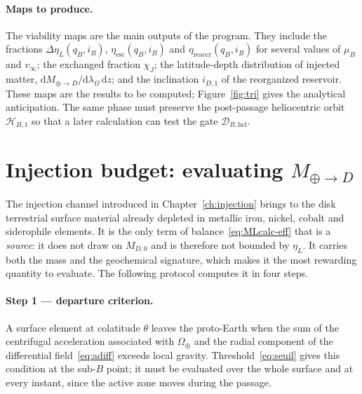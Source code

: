 \documentclass[11pt,a4paper,openany]{report}
\newcommand{\dd}{\mathrm{d}}
\begin{document}
\paragraph{Maps to produce.}
The viability maps are the main outputs of the program. They include the fractions
$\Delta\eta_L(q_B,i_B)$, $\eta_{\mathrm{esc}}(q_B,i_B)$ and $\eta_{\mathrm{reaccr}}(q_B,i_B)$ for
several values of $\mu_B$ and $v_\infty$; the exchanged fraction $\chi_J$; the latitude-depth
distribution of injected matter, $\dd M_{\oplus\to D}/\dd\lambda_\Omega\,\dd z$; and the
inclination $i_{D,1}$ of the reorganized reservoir. These maps are the results to be computed;
Figure~\ref{fig:tri} gives the analytical anticipation.
The same phase must preserve the post-passage heliocentric orbit $\mathcal{H}_{B,1}$ so that a
later calculation can test the gate $\mathcal{D}_{B,\mathrm{hel}}$.

\section{Injection budget: evaluating \texorpdfstring{$M_{\oplus\to D}$}{M_Earth-to-D}}
\label{sec:bilan-injection}

The injection channel introduced in Chapter~\ref{ch:injection} brings to the disk terrestrial
surface material already depleted in metallic iron, nickel, cobalt and siderophile elements. It is
the only term of balance~\eqref{eq:MLcalc-eff} that is a \emph{source}: it does not draw on
$M_{D,0}$ and is therefore not bounded by $\eta_L$. It carries both the mass and the geochemical
signature, which makes it the most rewarding quantity to evaluate. The following protocol computes
it in four steps.

\paragraph{Step 1 --- departure criterion.} A surface element at colatitude $\theta$ leaves the
proto-Earth when the sum of the centrifugal acceleration associated with $\Omega_\oplus$ and the
radial component of the differential field~\eqref{eq:adiff} exceeds local gravity. Threshold~\eqref{eq:seuil} gives this condition at the sub-$B$ point; it must be evaluated over the
whole surface and at every instant, since the active zone moves during the passage.
\end{document}
